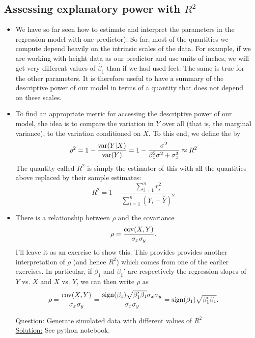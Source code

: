 \subsection{Assessing explanatory power with $R^2$}
\begin{itemize}
\item We have so far seen how to estimate and interpret the parameters in the regression model with one predictor). So far, most of the quantities we compute depend heavily on the intrinsic scales of the data. For example, if we are working with height data as our predictor and use units of inches, we will get very different values of $\hat{\beta}_1$ than if we had used feet. The same is true for the other parameters. It is therefore useful to have a summary of the descriptive power of our model in terms of a quantity that does not depend on these scales. %
\item To find an appropriate metric for accessing the descriptive power of our model, the idea is to compare the variation in $Y$ over all (that is, the marginal variance), to the variation conditioned on $X$. To this end, we define the  by 
\begin{equation}
\rho^2 = 1 - \frac{{\rm var}(Y|X)}{{\rm var}(Y)} = 1 - \frac{\sigma^2}{\beta_1^2\sigma^2 +\sigma_x^2} \approx R^2
\end{equation}
The quantity called $R^2$ is simply the estimator of this with all the quantities above replaced by their sample estimates:
\begin{equation*}
R^2 = 1 - \frac{\sum_{i=1}^nr_i^2}{\sum_{i=1}^n (Y_i - \overline{Y})^2}
\end{equation*}
\item There is a relationship between $\rho$ and the covariance 
\begin{equation*}
\rho = \frac{{\rm cov}(X,Y)}{\sigma_x\sigma_y}. 
\end{equation*}
I'll leave it as an exercise to show this. This provides provides another interpretation of $\rho$ (and hence $R^2$) which comes from one of the earlier exercises. In particular, if $\beta_1$ and $\beta_1'$ are respectively the regression slopes of $Y$ vs. $X$ and $X$ vs. $Y$, we can then write $\rho$ as 
\begin{equation*}
\rho  =  \frac{{\rm cov}(X,Y)}{\sigma_x\sigma_y} =  \frac{{\rm sign}(\beta_1)\sqrt{\beta_1'\beta_1}\sigma_x\sigma_y}{\sigma_x\sigma_y} = {\rm sign}(\beta_1)\sqrt{\beta_1'\beta_1}. 
\end{equation*}


\begin{example}


\noindent
\underline{Question:} Generate simulated data with different values of $R^2$ \\ 

\noindent
\underline{Solution:} See python notebook. \\ 
\end{example}

\end{itemize}



